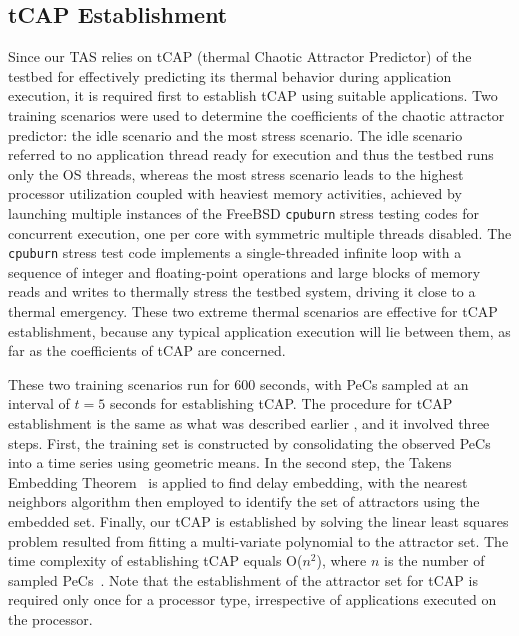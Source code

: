 \documentclass[times, 10pt,twocolumn]{IEEEtran}
\begin{document}
\subsection{tCAP Establishment}
\label{sec:callibration}
Since our TAS relies on tCAP (thermal Chaotic Attractor Predictor) of
the testbed for effectively predicting its thermal behavior during
application execution, it is required first to establish tCAP using
suitable applications.  Two training scenarios were used to determine
the coefficients of the chaotic attractor predictor: the idle scenario
and the most stress scenario.  The idle scenario referred to no
application thread ready for execution and thus the testbed runs only
the OS threads, whereas the most stress scenario leads to the highest
processor utilization coupled with heaviest memory activities, achieved
by launching multiple instances of the FreeBSD \texttt{cpuburn} stress
testing codes for concurrent execution, one per core with symmetric
multiple threads disabled.  The \texttt{cpuburn} stress test code
implements a single-threaded infinite loop with a sequence of integer
and floating-point operations and large blocks of memory reads and
writes to thermally stress the testbed system, driving it close to a
thermal emergency.  These two extreme thermal scenarios are effective for
tCAP establishment, because any typical application execution will lie
between them, as far as the coefficients of tCAP are
concerned.

These two training scenarios run for 600 seconds, with PeCs sampled at
an interval of $t=5$ seconds for establishing tCAP.  The procedure for
tCAP establishment is the same as what was described earlier
\cite{Lewis2010}, and it involved three steps. First, the training set
is constructed by consolidating the observed PeCs into a time series
using geometric means.  In the second step, the Takens Embedding
Theorem~\cite{Su2010} is applied to find delay embedding, with the
nearest neighbors algorithm then employed to identify the set of
attractors using the embedded set.  Finally, our tCAP is established by
solving the linear least squares problem resulted from fitting a
multi-variate polynomial to the attractor set.  The time complexity of
establishing tCAP equals O($n ^2$), where $n$ is the number of sampled
PeCs~\cite{Lewis2010}.  Note that the establishment of the attractor set
for tCAP is required only once for a processor type, irrespective of
applications executed on the processor.
\end{document}
